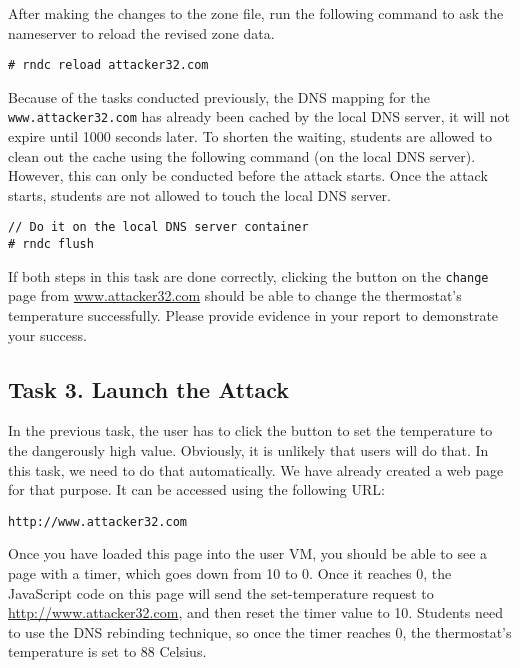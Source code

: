 After making the changes to the zone file, 
run the following command to ask the nameserver 
to reload the revised zone data. 

\begin{lstlisting}
# rndc reload attacker32.com
\end{lstlisting}



Because of the tasks conducted previously, the DNS mapping for the 
\texttt{www.attacker32.com} has already been cached by the local
DNS server, it will not expire until 1000 seconds later.  To 
shorten the waiting, students are allowed to clean out the cache using the 
following command (on the local DNS server). However, this can only be 
conducted before the attack starts. Once the attack starts, students 
are not allowed to touch the local DNS server. 

\begin{lstlisting}
// Do it on the local DNS server container
# rndc flush
\end{lstlisting}
 
 
If both steps in this task are done correctly, clicking the button 
on the \texttt{change} page from \url{www.attacker32.com} should be able to change
the thermostat's temperature successfully. Please provide evidence in your report to
demonstrate your success.


\subsection{Task 3. Launch the Attack}

In the previous task, the user has to click the button to set the 
temperature to the dangerously high value. Obviously, it is unlikely that users will 
do that.  In this task, we need to do that automatically. We have already created 
a web page for that purpose. It can be accessed using the following URL:


\begin{lstlisting}
http://www.attacker32.com
\end{lstlisting}
 

Once you have loaded this page into the user VM, you should be able to see a page with a 
timer, which goes down from 10 to 0. Once it reaches 0, the JavaScript code 
on this page will send the set-temperature request to 
\url{http://www.attacker32.com}, and then reset the timer value to 10. 
Students need to use the DNS rebinding technique, so
once the timer reaches 0, the thermostat's temperature is set to 
88 Celsius. 




